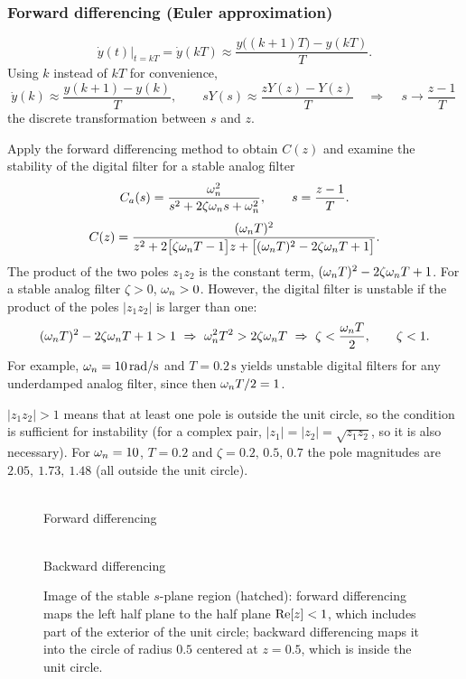 \subsubsection*{Forward differencing (Euler approximation)}
\[
  \dot y(t)\Big|_{t=kT}=\dot y(kT)\approx\frac{y\bigl((k+1)T\bigr)-y(kT)}{T}.
\]
Using $k$ instead of $kT$ for convenience,
\[
  \dot y(k)\approx\frac{y(k+1)-y(k)}{T},\qquad sY(s)\approx\frac{zY(z)-Y(z)}{T}
  \quad\Rightarrow\quad \boxed{\,s\to\frac{z-1}{T}\,}
\]
the discrete transformation between $s$ and $z$.

\begin{example}
Apply the forward differencing method to obtain $C(z)$ and examine the stability of the digital filter for a
stable analog filter
\[
  C_a(s)=\frac{\omega_n^{2}}{s^{2}+2\zeta\omega_n s+\omega_n^{2}},\qquad s=\frac{z-1}{T}.
\]
\[
  C(z)=\frac{(\omega_n T)^{2}}{z^{2}+2\bigl[\zeta\omega_n T-1\bigr]z+\bigl[(\omega_n T)^{2}-2\zeta\omega_n T+1\bigr]}.
\]
The product of the two poles $z_1z_2$ is the constant term, $(\omega_n T)^{2}-2\zeta\omega_n T+1$. For a stable analog filter
$\zeta>0$, $\omega_n>0$. However, the digital filter is unstable if the product of the poles $|z_1z_2|$ is larger
than one:
\[
  (\wn T)^{2}-2\zeta\wn T+1>1\ \Rightarrow\ \wn^{2}T^{2}>2\zeta\wn T\ \Rightarrow\ \zeta<\frac{\wn T}{2},\qquad\zeta<1.
\]
For example, $\omega_n=10\,\mathrm{rad/s}$ and $T=0.2\,\mathrm{s}$ yields unstable digital filters for any underdamped analog
filter, since then $\omega_n T/2=1$.
\end{example}
\begin{remark}[added]
$|z_1z_2|>1$ means that at least one pole is outside the unit circle, so the condition is sufficient for
instability (for a complex pair, $|z_1|=|z_2|=\sqrt{z_1z_2}$, so it is also necessary). For $\omega_n=10$, $T=0.2$ and
$\zeta=0.2,\,0.5,\,0.7$ the pole magnitudes are $2.05,\ 1.73,\ 1.48$ (all outside the unit circle).
\end{remark}

\begin{figure}[ht]
\centering
\begin{minipage}{0.46\linewidth}\centering\resizebox{\linewidth}{!}{\figFwdMap}\\ Forward differencing\end{minipage}\hfill
\begin{minipage}{0.46\linewidth}\centering\resizebox{0.86\linewidth}{!}{\figBwdMap}\\ Backward differencing\end{minipage}
\caption{Image of the stable $s$-plane region (hatched): forward differencing maps the left half plane to the
half plane $\operatorname{Re}[z]<1$, which includes part of the exterior of the unit circle; backward differencing maps it
into the circle of radius $0.5$ centered at $z=0.5$, which is inside the unit circle.}
\end{figure}

